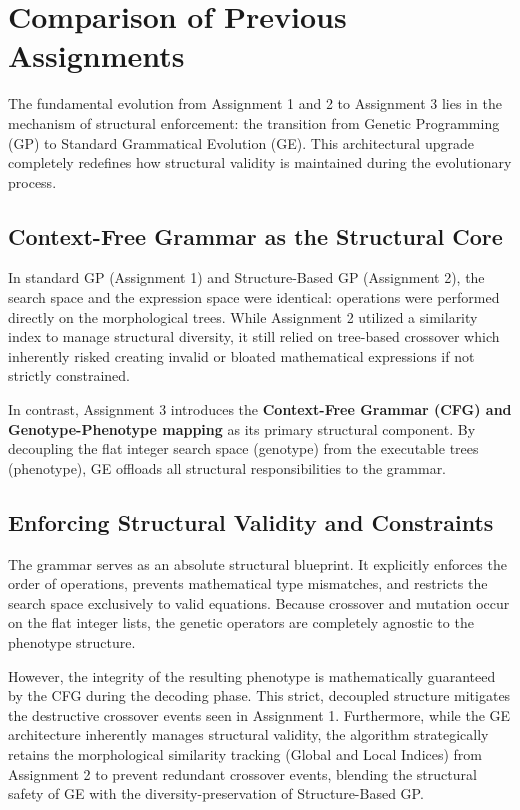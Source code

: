 \documentclass[12pt]{article}
\begin{document}
\section{Comparison of Previous Assignments}

    The fundamental evolution from Assignment 1 and 2 to Assignment 3 lies in the mechanism of structural enforcement: the transition from Genetic Programming (GP) to Standard Grammatical Evolution (GE). This architectural upgrade completely redefines how structural validity is maintained during the evolutionary process.

    \subsection{Context-Free Grammar as the Structural Core}
        In standard GP (Assignment 1) and Structure-Based GP (Assignment 2), the search space and the expression space were identical: operations were performed directly on the morphological trees. While Assignment 2 utilized a similarity index to manage structural diversity, it still relied on tree-based crossover which inherently risked creating invalid or bloated mathematical expressions if not strictly constrained.

        In contrast, Assignment 3 introduces the \textbf{Context-Free Grammar (CFG) and Genotype-Phenotype mapping} as its primary structural component. By decoupling the flat integer search space (genotype) from the executable trees (phenotype), GE offloads all structural responsibilities to the grammar.

    \subsection{Enforcing Structural Validity and Constraints}
        The grammar serves as an absolute structural blueprint. It explicitly enforces the order of operations, prevents mathematical type mismatches, and restricts the search space exclusively to valid equations. Because crossover and mutation occur on the flat integer lists, the genetic operators are completely agnostic to the phenotype structure. 
        
        However, the integrity of the resulting phenotype is mathematically guaranteed by the CFG during the decoding phase. This strict, decoupled structure mitigates the destructive crossover events seen in Assignment 1. Furthermore, while the GE architecture inherently manages structural validity, the algorithm strategically retains the morphological similarity tracking (Global and Local Indices) from Assignment 2 to prevent redundant crossover events, blending the structural safety of GE with the diversity-preservation of Structure-Based GP.
\end{document}

